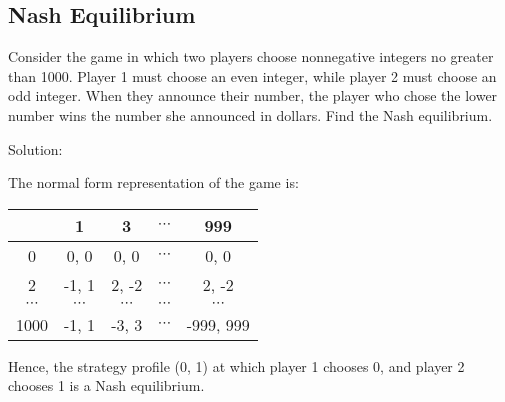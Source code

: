 \documentclass[11pt, answers]{exam}
\begin{document}
%
%
\begin{questions}
\section{Nash Equilibrium}
\question
Consider the game in which two players choose nonnegative integers no greater than 1000. Player 1 must choose an even integer, while player 2 must choose an odd integer. When they announce their number, the player who chose the lower number wins the number she announced in dollars. Find the Nash equilibrium.

Solution: 

The normal form representation of the game is:
\begin{table}[htbp]
	\centering
	\begin{tabular}{|c|c|c|c|c|}
		\hline
		& 1     & 3   & $\cdots$  & 999 \\
		\hline
		0     & 0, 0  & 0, 0 & $\cdots$ & 0, 0 \\
		\hline
		2     & -1, 1 & 2, -2 & $\cdots$  & 2, -2 \\
		\hline
		$\cdots$     & $\cdots$  & $\cdots$  & $\cdots$ & $\cdots$ \\
		\hline
		1000     & -1, 1 & -3, 3 & $\cdots$  & -999, 999 \\
		\hline
	\end{tabular}
\end{table}

Hence, the strategy profile (0, 1) at which player 1 chooses 0, and player 2 chooses 1 is a Nash equilibrium.
\end{questions}
\end{document}

